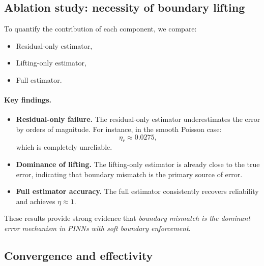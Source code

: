 \subsection{Ablation study: necessity of boundary lifting}

To quantify the contribution of each component, we compare:

\begin{itemize}
\item Residual-only estimator,
\item Lifting-only estimator,
\item Full estimator.
\end{itemize}

\begin{table}[h]
\centering
\caption{Ablation study of estimator components.}
\label{tab:ablation_results}
\resizebox{\textwidth}{!}{%

}
\end{table}

\paragraph{Key findings.}

\begin{itemize}

\item \textbf{Residual-only failure.}
The residual-only estimator underestimates the error by orders of magnitude.
For instance, in the smooth Poisson case:
\[
\eta_r \approx 0.0275,
\]
which is completely unreliable.

\item \textbf{Dominance of lifting.}
The lifting-only estimator is already close to the true error,
indicating that boundary mismatch is the primary source of error.

\item \textbf{Full estimator accuracy.}
The full estimator consistently recovers reliability and achieves
$\eta \approx 1$.

\end{itemize}

These results provide strong evidence that \emph{boundary mismatch is the
dominant error mechanism in PINNs with soft boundary enforcement}.

\subsection{Convergence and effectivity}

